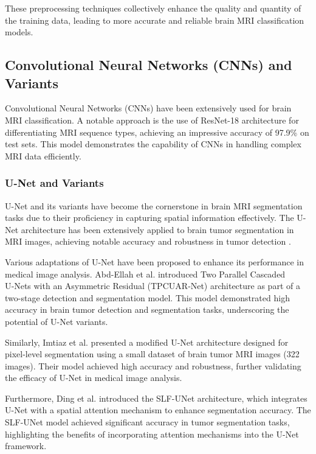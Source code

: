 These preprocessing techniques collectively enhance the quality and quantity of the training data, leading to more accurate and reliable brain MRI classification models.

\subsection{Convolutional Neural Networks (CNNs) and Variants}

Convolutional Neural Networks (CNNs) have been extensively used for brain MRI classification. A notable approach is the use of ResNet-18 architecture for differentiating MRI sequence types, achieving an impressive accuracy of 97.9\% on test sets. This model demonstrates the capability of CNNs in handling complex MRI data efficiently\cite{doi:10.1148/ryai.230095}.

\subsubsection{U-Net and Variants}

U-Net and its variants have become the cornerstone in brain MRI segmentation tasks due to their proficiency in capturing spatial information effectively. The U-Net architecture has been extensively applied to brain tumor segmentation in MRI images, achieving notable accuracy and robustness in tumor detection \cite{imtiaz_brain_2023, abd-ellah_automatic_2024, ding_slf-unet_2024}.

Various adaptations of U-Net have been proposed to enhance its performance in medical image analysis. Abd-Ellah et al. \cite{abd-ellah_automatic_2024} introduced Two Parallel Cascaded U‑Nets with an Asymmetric Residual (TPCUAR‑Net) architecture as part of a two-stage detection and segmentation model. This model demonstrated high accuracy in brain tumor detection and segmentation tasks, underscoring the potential of U-Net variants.

Similarly, Imtiaz et al. \cite{imtiaz_brain_2023} presented a modified U-Net architecture designed for pixel-level segmentation using a small dataset of brain tumor MRI images (322 images). Their model achieved high accuracy and robustness, further validating the efficacy of U-Net in medical image analysis.

Furthermore, Ding et al. \cite{ding_slf-unet_2024} introduced the SLF-UNet architecture, which integrates U-Net with a spatial attention mechanism to enhance segmentation accuracy. The SLF-UNet model achieved significant accuracy in tumor segmentation tasks, highlighting the benefits of incorporating attention mechanisms into the U-Net framework.

